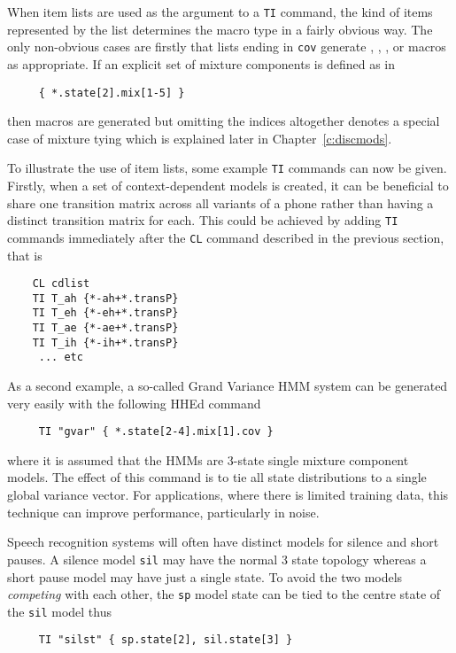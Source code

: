 When item lists are used as the argument to a \texttt{TI} 
command, the
kind of items represented by the list determines the macro type in a fairly
obvious way.  The only non-obvious cases are firstly that lists ending
in \texttt{cov} generate , , , or  macros as
appropriate.   If an explicit set of mixture components is defined
as in
\begin{verbatim}
     { *.state[2].mix[1-5] }
\end{verbatim}
then   macros are generated but omitting
the indices  altogether denotes a special case of mixture 
tying
which is explained later in Chapter~\ref{c:discmods}.

To illustrate the use of item lists, some example \texttt{TI} commands
can now be given.  Firstly, when a set of context-dependent models is created, it can
be beneficial to share one transition matrix across all variants
of a phone rather than having a distinct transition matrix for each.
This could be achieved by adding \texttt{TI}
commands immediately after the \texttt{CL} command described in
the previous section, that is
\begin{verbatim}
    CL cdlist
    TI T_ah {*-ah+*.transP}
    TI T_eh {*-eh+*.transP}
    TI T_ae {*-ae+*.transP}
    TI T_ih {*-ih+*.transP}
     ... etc
\end{verbatim}

As a second example, a so-called Grand Variance 
HMM system can
be generated very easily with the following HHEd command
\begin{verbatim}
     TI "gvar" { *.state[2-4].mix[1].cov }
\end{verbatim}
where it is assumed that the HMMs are 3-state 
single mixture component models.   The effect
of this command is to tie all state distributions to a single global variance
vector.  For applications, where there is limited training data, this technique
can improve performance, particularly in noise.

Speech recognition systems will often have distinct
models for silence  and short pauses.  A 
silence model \texttt{sil} may have
the normal 3 state topology whereas a short pause model may have just 
a single state.  To avoid the two models \textit{competing} with each other, the
\texttt{sp} model state can be tied to the centre state of the \texttt{sil} model
thus
\begin{verbatim}
     TI "silst" { sp.state[2], sil.state[3] }
\end{verbatim}

